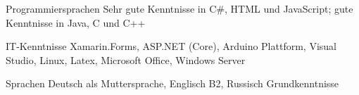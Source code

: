 


\begin{cvskills}


\cvskill
{Programmiersprachen} %
{Sehr gute Kenntnisse in C\#, HTML und JavaScript; gute Kenntnisse in Java, C und C++} %


\cvskill
{IT-Kenntnisse} %
{Xamarin.Forms, ASP.NET (Core), Arduino Plattform, Visual Studio, Linux, Latex, Microsoft Office, Windows Server} %


\cvskill
{Sprachen} %
{Deutsch als Muttersprache, Englisch B2, Russisch Grundkenntnisse} %


\end{cvskills}